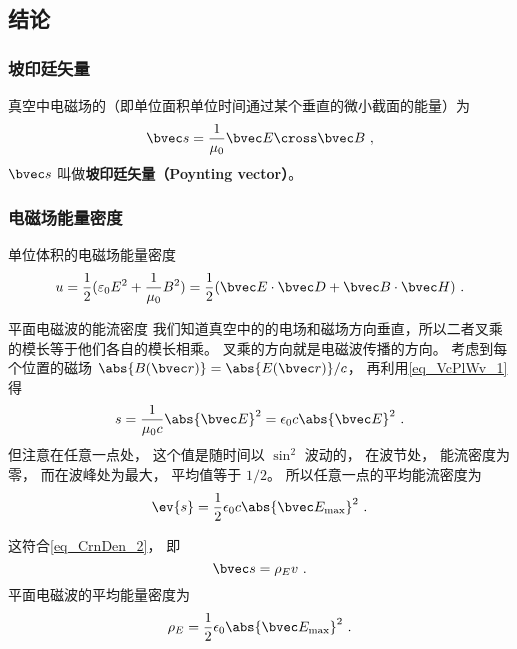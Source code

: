 



\subsection{结论}

\subsubsection{坡印廷矢量}
真空中电磁场的（即单位面积单位时间通过某个垂直的微小截面的能量）为
\begin{equation}
\bvec s = \frac{1}{\mu_0} \bvec E \cross \bvec B~,
\end{equation} 
$\bvec s$ 叫做\textbf{坡印廷矢量（Poynting vector）}。

\subsubsection{电磁场能量密度}
单位体积的电磁场能量密度\cite{GriffE}
\begin{equation}\label{eq_EBS_6}
u=\frac{1}{2}(\varepsilon_0 E^2+ \frac{1}{\mu_0} B^2)=\frac{1}{2} (\bvec E \cdot \bvec D + \bvec B \cdot \bvec H)~.
\end{equation} 

\begin{example}{平面电磁波的能流密度}\label{ex_EBS_1}
我们知道真空中的的电场和磁场方向垂直，所以二者叉乘的模长等于他们各自的模长相乘。 叉乘的方向就是电磁波传播的方向。 考虑到每个位置的磁场 $\abs{B(\bvec r)} = \abs{E(\bvec r)}/c$， 再利用\autoref{eq_VcPlWv_1} 得
\begin{equation}
s = \frac{1}{\mu_0 c} \abs{\bvec E}^2 = \epsilon_0 c \abs{\bvec E}^2~.
\end{equation}
但注意在任意一点处， 这个值是随时间以 $\sin^2$ 波动的， 在波节处， 能流密度为零， 而在波峰处为最大， 平均值等于 $1/2$。 %
所以任意一点的平均能流密度为
\begin{equation}\label{eq_EBS_7}
\ev{s} = \frac{1}{2} \epsilon_0 c \abs{\bvec E_\text{max}}^2~.
\end{equation}

这符合\autoref{eq_CrnDen_2}， 即
\begin{equation}
\bvec s = \rho_E v~.
\end{equation}
平面电磁波的平均能量密度为
\begin{equation}
\rho_E = \frac{1}{2} \epsilon_0 \abs{\bvec E_\text{max}}^2~.
\end{equation}
\end{example}

